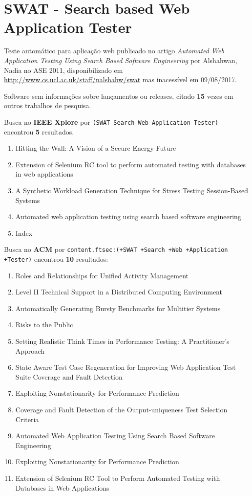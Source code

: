 \section{SWAT - Search based Web Application Tester}

Teste automático para aplicação web
publicado no artigo {\it Automated Web Application Testing Using Search Based Software Engineering}
por Alshahwan, Nadia
no ASE 2011,
disponibilizado em \url{http://www.cs.ucl.ac.uk/staff/nalshahw/swat}
mas inacessível em 09/08/2017.

Software sem informações sobre lançamentos ou releases,
citado {\bf 15} vezes em outros trabalhos de pesquisa.

Busca no {\bf IEEE Xplore} por
\texttt{(SWAT Search Web Application Tester)}
encontrou {\bf 5}
resultados.

\begin{enumerate}
\item Hitting the Wall: A Vision of a Secure Energy Future
\item Extension of Selenium RC tool to perform automated testing with databases in web applications
\item A Synthetic Workload Generation Technique for Stress Testing Session-Based Systems
\item Automated web application testing using search based software engineering
\item Index
\end{enumerate}

Busca no {\bf ACM} por
\texttt{content.ftsec:(+SWAT +Search +Web +Application +Tester)}
encontrou {\bf 10}
resultados:

\begin{enumerate}
\item Roles and Relationships for Unified Activity Management
\item Level II Technical Support in a Distributed Computing Environment
\item Automatically Generating Bursty Benchmarks for Multitier Systems
\item Risks to the Public
\item Setting Realistic Think Times in Performance Testing: A Practitioner's Approach
\item State Aware Test Case Regeneration for Improving Web Application Test Suite Coverage and Fault Detection
\item Exploiting Nonstationarity for Performance Prediction
\item Coverage and Fault Detection of the Output-uniqueness Test Selection Criteria
\item Automated Web Application Testing Using Search Based Software Engineering
\item Exploiting Nonstationarity for Performance Prediction
\item Extension of Selenium RC Tool to Perform Automated Testing with Databases in Web Applications
\end{enumerate}

